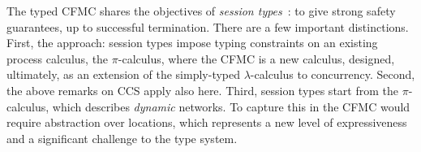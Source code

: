 \documentclass{article}
\theoremstyle{definition}
\theoremstyle{plain}
\begin{document}
The typed CFMC shares the objectives of \emph{session types}~\cite{Honda-1993,Caires-Pfenning-2010}: to give strong safety guarantees, up to successful termination. There are a few important distinctions. First, the approach: session types impose typing constraints on an existing process calculus, the $\pi$-calculus, where the CFMC is a new calculus, designed, ultimately, as an extension of the simply-typed $\lambda$-calculus to concurrency. Second, the above remarks on CCS apply also here. Third, session types start from the $\pi$-calculus, which describes \emph{dynamic} networks. To capture this in the CFMC would require abstraction over locations, which represents a new level of expressiveness and a significant challenge to the type system.




\end{document}
